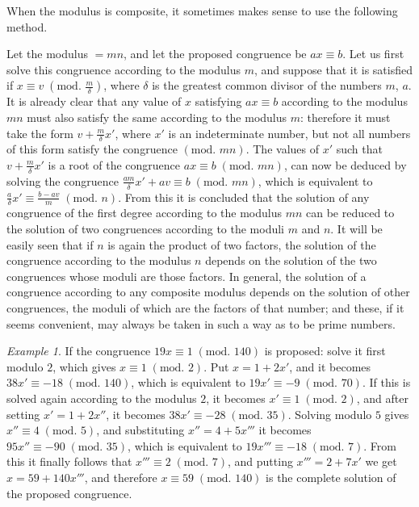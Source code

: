 \documentclass{book}
\theoremstyle{plain}
\theoremstyle{remark}
\newtheorem*{example}{Example}
\begin{document}
When the modulus is composite, it sometimes makes sense to use the following method. 


Let the modulus $=mn$, and let the proposed congruence be $ax \equiv b$.  Let us first solve this congruence according to the modulus $m$, and suppose that it is satisfied if $x \equiv v \;(\textrm{mod. }\frac{m}{\delta})$, where $\delta $ is the greatest common divisor of the numbers $m$, $a$.  It is already clear that any value of $x$ satisfying $ax \equiv b$ according to the modulus $mn$ must also satisfy the same according to the modulus $m$: therefore it must take the form $v + \frac{m}{\delta} x'$, where $x'$ is an indeterminate number, but not all numbers of this form satisfy the congruence $(\textrm{mod. } mn)$.    The values of  $x'$ such that $v + \frac{m}{\delta}x'$ is a root of the congruence $ax\equiv b \; (\textrm{mod. } mn)$, can now be deduced by solving the congruence $\frac{am}{\delta}x' + av \equiv b \; (\textrm{mod. } mn)$, which is equivalent to $\frac{a}{\delta} x' \equiv \frac{b-av}{m}\;(\textrm{mod. }n)$.  From this it is concluded that the solution of any congruence of the first degree according to the modulus $mn$ can be reduced to the solution of two congruences according to the moduli $m$ and $n$.  It will be easily seen that if $n$ is again the product of two factors, the solution of the congruence according to the modulus $n$ depends on the solution of the two congruences whose moduli are those factors.  In general, the solution of a congruence according to any composite modulus depends on the solution of other congruences, the moduli of which are the factors of that number; and these, if it seems convenient, may always be taken in such a way as to be prime numbers.

\begin{example} If the congruence $19x \equiv 1 \;(\textrm{mod. }140)$ is proposed: solve it first modulo $2$, which gives $x \equiv 1\; (\textrm{mod. }2)$.  Put $x = 1 + 2x'$, and it becomes $38x' \equiv -18\;(\textrm{mod. }140)$, which is equivalent to $19x' \equiv -9 \;(\textrm{mod. }70)$. If this is solved again according to the modulus $2$, it becomes $x' \equiv 1 \; (\textrm{mod. }2)$, and after setting $x' = 1 + 2x''$, it becomes $38x' \equiv -28\;(\textrm{mod. }35)$.  Solving modulo $5$ gives $x'' \equiv 4 \; (\textrm{mod. }5)$, and substituting $x'' = 4 + 5x'''$ it becomes $95x'' \equiv -90\;(\textrm{mod. }35)$, which is equivalent to $19x''' \equiv -18 \;(\textrm{mod. }7)$.  From this it finally follows that $x''' \equiv 2 \;(\textrm{mod. }7)$, and putting $x''' = 2 + 7x'$ we get $x = 59 + 140x'''$, and therefore $x \equiv 59 \;(\textrm{mod. }140)$ is the complete solution of the proposed congruence.\end{example}
\end{document}
